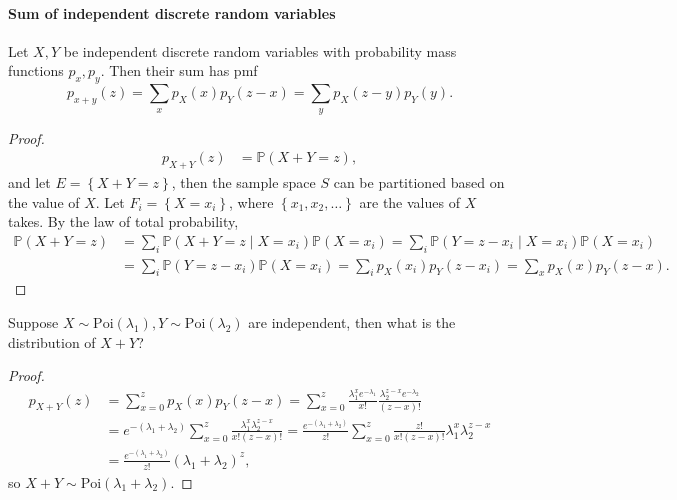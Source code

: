 \paragraph{Sum of independent discrete random variables}
\begin{proposition}
    Let \(X, Y\) be independent discrete random variables with probability mass functions \(p_x, p_y\). Then their sum has pmf 
    \[
        p_{x+y}(z) = \sum_{x} p_X(x) p_Y(z - x) = \sum_{y} p_X(z - y) p_Y(y).  
    \]  
\end{proposition}

\begin{proof}
    \begin{align*}
        p_{X + Y}(z) &= \mathbb{P} (X + Y = z),
    \end{align*}
    and let \(E = \left\{ X + Y = z \right\} \), then the sample space \(S\) can be partitioned based on the value of \(X\). Let \(F_i = \left\{ X = x_i \right\} \), where \(\left\{ x_1, x_2, \dots  \right\} \) are the values of \(X\) takes. By the law of total probability,
    \begin{align*}
        \mathbb{P} (X + Y = z) &= \sum_{i} \mathbb{P} (X + Y = z \mid X = x_i) \mathbb{P} (X = x_i) = \sum_{i} \mathbb{P} (Y = z - x_i \mid X = x_i) \mathbb{P} (X = x_i) \\
        &= \sum_{i} \mathbb{P} (Y = z - x_i) \mathbb{P} (X = x_i) = \sum_{i} p_X(x_i) p_Y(z - x_i) = \sum_{x} p_X(x) p_Y(z - x).    
    \end{align*}      
\end{proof}

\begin{eg}
Suppose \(X \sim \mathrm{Poi}(\lambda_1), Y \sim \mathrm{Poi}(\lambda _2)  \) are independent, then what is the distribution of \(X + Y\)?  
\end{eg}

\begin{proof}
    \begin{align*}
        p_{X + Y}(z) &= \sum_{x = 0}^z p_X(x) p_Y(z - x) = \sum_{x = 0}^z \frac{\lambda _1 ^x e^{-\lambda _1}}{x!} \frac{\lambda _2^{z - x} e^{-\lambda _2}}{(z - x)!} \\
        &= e^{-(\lambda _1 + \lambda _2)} \sum_{x=0}^z \frac{\lambda _1^x \lambda _2^{z - x}}{x! (z - x)!} = \frac{e^{-(\lambda _1 + \lambda _2)}}{z!} \sum_{x=0}^z \frac{z!}{x! (z - x)!} \lambda _1^x \lambda _2^{z - x} \\
        &= \frac{e^{-(\lambda_1 + \lambda _2)}}{z!} (\lambda _1 + \lambda _2)^z,   
    \end{align*}
    so \(X + Y \sim \mathrm{Poi}(\lambda _1 + \lambda _2) \). 
\end{proof}

